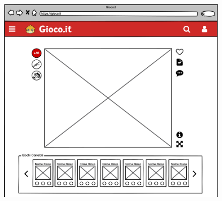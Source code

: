 \documentclass[../Report.tex]{subfiles}
\begin{document}
    \begin{figure}[H]
        \includegraphics[width=0.9\linewidth]{WGioco_1 (new version).png}
        \centering
    \end{figure}
    
\end{document}
